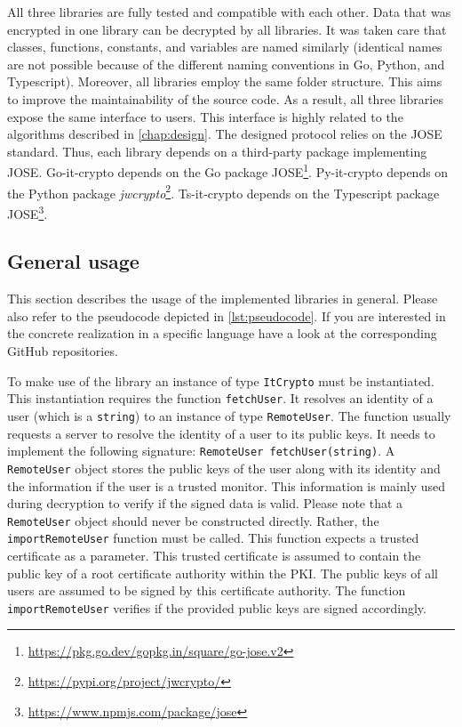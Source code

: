 \documentclass[../main.tex]{subfiles}
\begin{document}
All three libraries are fully tested and compatible with each other.
Data that was encrypted in one library can be decrypted by all libraries.
It was taken care that classes, functions, constants, and variables are named similarly (identical names are not possible because of the different naming conventions in Go, Python, and Typescript).
Moreover, all libraries employ the same folder structure.
This aims to improve the maintainability of the source code.
As a result, all three libraries expose the same interface to users.
This interface is highly related to the algorithms described in \cref{chap:design}.
The designed protocol relies on the JOSE standard.
Thus, each library depends on a third-party package implementing JOSE.
Go-it-crypto depends on the Go package JOSE\footnote{\url{https://pkg.go.dev/gopkg.in/square/go-jose.v2}}.
Py-it-crypto depends on the Python package \emph{jwcrypto}\footnote{\url{https://pypi.org/project/jwcrypto/}}.
Ts-it-crypto depends on the Typescript package JOSE\footnote{\url{https://www.npmjs.com/package/jose}}.


\subsection{General usage}

This section describes the usage of the implemented libraries in general.
Please also refer to the pseudocode depicted in \cref{lst:pseudocode}.
If you are interested in the concrete realization in a specific language have a look at the corresponding GitHub repositories.

To make use of the library an instance of type \verb|ItCrypto| must be instantiated.
This instantiation requires the function \verb|fetchUser|.
It resolves an identity of a user (which is a \verb|string|) to an instance of type \verb|RemoteUser|.
The function usually requests a server to resolve the identity of a user to its public keys.
It needs to implement the following signature: \verb|RemoteUser fetchUser(string)|.
A \verb|RemoteUser| object stores the public keys of the user along with its identity and the information if the user is a trusted monitor.
This information is mainly used during decryption to verify if the signed data is valid.
Please note that a \verb|RemoteUser| object should never be constructed directly.
Rather, the \verb|importRemoteUser| function must be called.
This function expects a trusted certificate as a parameter.
This trusted certificate is assumed to contain the public key of a root certificate authority within the PKI.
The public keys of all users are assumed to be signed by this certificate authority.
The function \verb|importRemoteUser| verifies if the provided public keys are signed accordingly.
\end{document}
